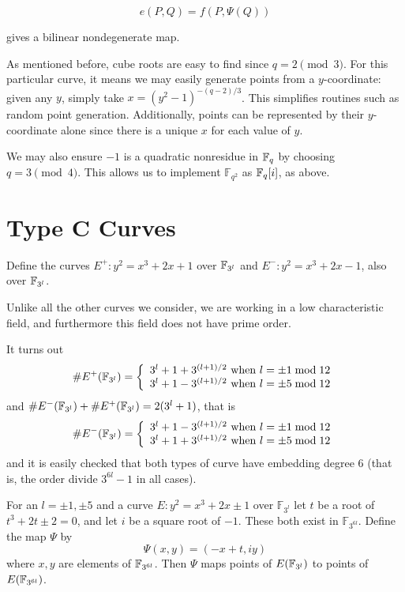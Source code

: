 \[ e(P,Q) = f(P, \Psi(Q)) \]

gives a bilinear nondegenerate map.

As mentioned before, cube roots are easy to find since $q = 2 \pmod{3}$.
For this particular curve, it means we may easily generate points from
a $y$-coordinate: given any $y$, simply take $x = (y^2-1)^{-(q-2)/3}$.
This simplifies routines such as random point generation. Additionally,
points can be represented by their $y$-coordinate alone since there is
a unique $x$ for each value of $y$.

We may also ensure $-1$ is a quadratic nonresidue in $\mathbb{F}_q$ by
choosing $q = 3\pmod{4}$. This allows us to implement $\mathbb{F}_{q^2}$
as $\mathbb{F}_q[i]$, as above.

\section { Type C Curves }

Define the curves $E^{+} : y^2 = x^3 + 2 x + 1$ over $\mathbb{F}_{3^l}$
and $E^{-} : y^2 = x^3 + 2 x - 1$, also over $\mathbb{F}_{3^l}$.

Unlike all the other curves we consider,
we are working in a low characteristic field, and furthermore this
field does not have prime order.

It turns out
\[
\#E^+(\mathbb{F}_{3^l}) = \left \{ \begin{array}{rcl}
3^l + 1 + 3^{(l+1)/2} \mbox { when } l = \pm 1 \bmod 12 \\
3^l + 1 - 3^{(l+1)/2} \mbox { when } l = \pm 5 \bmod 12
\end{array} \right.
\]
and $\#E^-(\mathbb{F}_{3^l}) + \#E^+(\mathbb{F}_{3^l}) = 2(3^l + 1)$, that is
\[
\#E^-(\mathbb{F}_{3^l}) = \left \{ \begin{array}{rcl}
3^l + 1 - 3^{(l+1)/2} \mbox { when } l = \pm 1 \bmod 12 \\
3^l + 1 + 3^{(l+1)/2} \mbox { when } l = \pm 5 \bmod 12
\end{array} \right.
\]
and it is easily checked that both types of curve have embedding
degree 6 (that is, the order divide $3^{6l} -1$ in all cases).

For an $l = \pm 1, \pm 5$ and a
curve $E : y^2 = x^3 + 2 x \pm 1$ over $\mathbb{F}_{3^l}$
let $t$ be a root of $t^3 + 2t \pm 2 = 0$, and let $i$ be a
square root of $-1$. These both exist in $\mathbb{F}_{3^{6l}}$.
Define the map $\Psi$ by
\[ \Psi(x,y) = (-x + t, i y) \]
where $x, y$ are elements of $\mathbb{F}_{3^{6l}}$. Then $\Psi$ maps points
of $E(\mathbb{F}_{3^l})$ to points of $E(\mathbb{F}_{3^{6l}})$.

